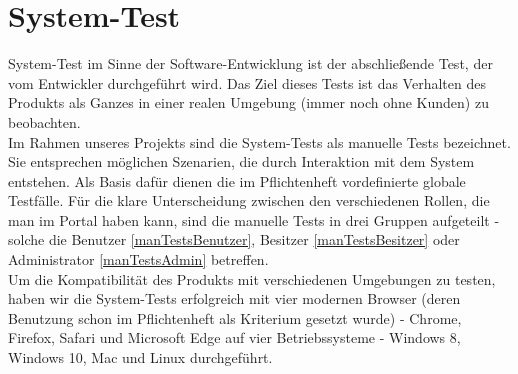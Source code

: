 \documentclass[parskip=full,11pt]{scrartcl}
\begin{document}
\newpage
\section{System-Test} \label{systemtest}
System-Test im Sinne der Software-Entwicklung ist der abschließende Test, der vom Entwickler durchgeführt wird. Das Ziel dieses Tests ist das Verhalten des Produkts als Ganzes in einer realen Umgebung (immer noch ohne Kunden) zu beobachten.\\
Im Rahmen unseres Projekts sind die System-Tests als manuelle Tests bezeichnet. Sie entsprechen möglichen Szenarien, die durch Interaktion mit dem System entstehen. Als Basis dafür dienen die im Pflichtenheft vordefinierte globale Testfälle. Für die klare Unterscheidung zwischen den verschiedenen Rollen, die man im Portal haben kann, sind die manuelle Tests in drei Gruppen aufgeteilt - solche die Benutzer \ref{manTestsBenutzer}, Besitzer \ref{manTestsBesitzer} oder Administrator \ref{manTestsAdmin} betreffen.\\
Um die Kompatibilität des Produkts mit verschiedenen Umgebungen zu testen, haben wir die System-Tests erfolgreich mit vier modernen Browser (deren Benutzung schon im Pflichtenheft als Kriterium gesetzt wurde) - Chrome, Firefox, Safari und Microsoft Edge auf vier Betriebssysteme - Windows 8, Windows 10, Mac und Linux durchgeführt.  
\end{document}
